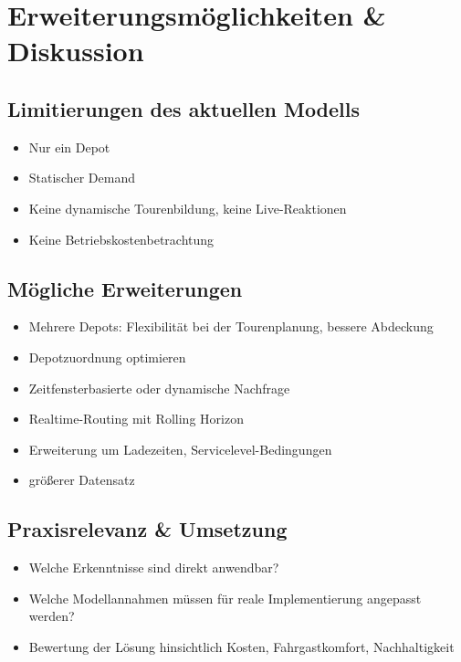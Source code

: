 \chapter{Erweiterungsmöglichkeiten \& Diskussion}
\section{Limitierungen des aktuellen Modells}
\begin{itemize}
    \item Nur ein Depot
    \item Statischer Demand
    \item Keine dynamische Tourenbildung, keine Live-Reaktionen
    \item Keine Betriebskostenbetrachtung
\end{itemize}

\section{Mögliche Erweiterungen}
\begin{itemize}
    \item Mehrere Depots: Flexibilität bei der Tourenplanung, bessere Abdeckung
    \item Depotzuordnung optimieren
    \item Zeitfensterbasierte oder dynamische Nachfrage
    \item Realtime-Routing mit Rolling Horizon
    \item Erweiterung um Ladezeiten, Servicelevel-Bedingungen
    \item größerer Datensatz
\end{itemize}

\section{Praxisrelevanz \& Umsetzung}
\begin{itemize}
    \item Welche Erkenntnisse sind direkt anwendbar?
    \item Welche Modellannahmen müssen für reale Implementierung angepasst werden?
    \item Bewertung der Lösung hinsichtlich Kosten, Fahrgastkomfort, Nachhaltigkeit
\end{itemize}
